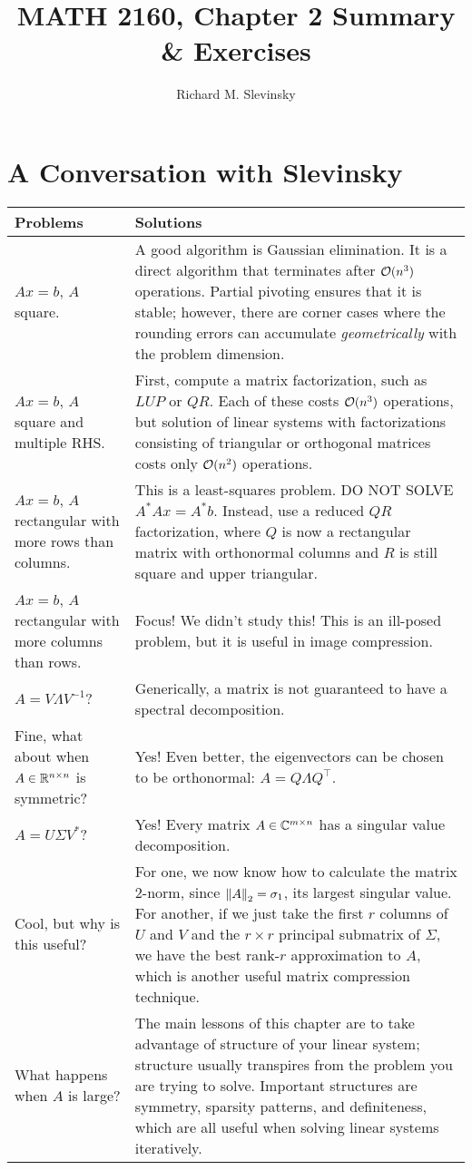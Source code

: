 \documentclass[11pt,letterpaper]{article}
\begin{document}
\title{MATH 2160, Chapter 2 Summary \& Exercises}
\author{Richard M. Slevinsky}
\date{}
\maketitle

\section*{A Conversation with Slevinsky}

\begin{longtable}{p{}|p{}}
\hline
Problems & Solutions\\
\hline
$Ax = b$, $A$ square. & A good algorithm is Gaussian elimination. It is a direct algorithm that terminates after $\mathcal{O}(n^3)$ operations. Partial pivoting ensures that it is stable; however, there are corner cases where the rounding errors can accumulate {\em geometrically} with the problem dimension.\\
$Ax = b$, $A$ square and multiple RHS. & First, compute a matrix factorization, such as $LUP$ or $QR$. Each of these costs $\mathcal{O}(n^3)$ operations, but solution of linear systems with factorizations consisting of triangular or orthogonal matrices costs only $\mathcal{O}(n^2)$ operations.\\
$Ax = b$, $A$ rectangular with more rows than columns. & This is a least-squares problem. DO NOT SOLVE $A^* A x = A^* b$. Instead, use a reduced $QR$ factorization, where $Q$ is now a rectangular matrix with orthonormal columns and $R$ is still square and upper triangular.\\
$Ax = b$, $A$ rectangular with more columns than rows. & Focus! We didn't study this! This is an ill-posed problem, but it is useful in image compression.\\
$A = V\Lambda V^{-1}$? & Generically, a matrix is not guaranteed to have a spectral decomposition.\\
Fine, what about when $A\in\mathbb{R}^{n\times n}$ is symmetric? & Yes! Even better, the eigenvectors can be chosen to be orthonormal: $A = Q\Lambda Q^\top$.\\
$A = U\Sigma V^*$? & Yes! Every matrix $A\in\mathbb{C}^{m\times n}$ has a singular value decomposition.\\
Cool, but why is this useful? & For one, we now know how to calculate the matrix $2$-norm, since $\left\|{A}\right\|_2 = \sigma_1$, its largest singular value. For another, if we just take the first $r$ columns of $U$ and $V$ and the $r\times r$ principal submatrix of $\Sigma$, we have the best rank-$r$ approximation to $A$, which is another useful matrix compression technique.\\
What happens when $A$ is large? & The main lessons of this chapter are to take advantage of structure of your linear system; structure usually transpires from the problem you are trying to solve. Important structures are symmetry, sparsity patterns, and definiteness, which are all useful when solving linear systems iteratively.\\
\hline
\end{longtable}
\end{document}
